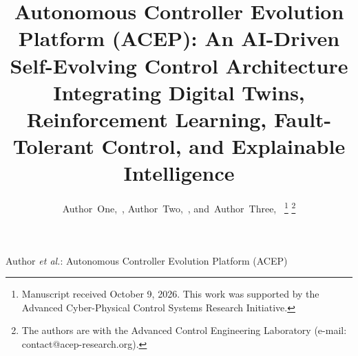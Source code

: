 \documentclass[journal,twocolumn]{IEEEtran}
\begin{document}
\title{Autonomous Controller Evolution Platform (ACEP): An AI-Driven Self-Evolving Control Architecture Integrating Digital Twins, Reinforcement Learning, Fault-Tolerant Control, and Explainable Intelligence}

\author{
    Author~One,~,
    Author~Two,~,
    and~Author~Three,~%
    \thanks{Manuscript received October 9, 2026. This work was supported by the Advanced Cyber-Physical Control Systems Research Initiative.}%
    \thanks{The authors are with the Advanced Control Engineering Laboratory (e-mail: contact@acep-research.org).}%
}

%
{Author \MakeLowercase{\textit{et al.}}: Autonomous Controller Evolution Platform (ACEP)}

\maketitle
\end{document}
